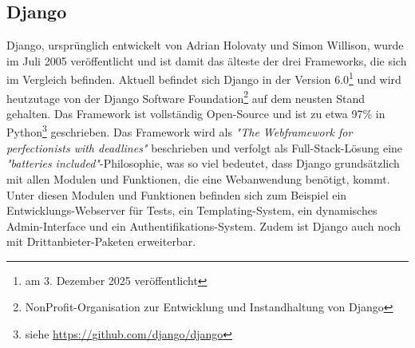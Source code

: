 \documentclass[letterpaper,11pt,leqno]{article}
\begin{document}
\subsection{Django}
Django, ursprünglich entwickelt von Adrian Holovaty und Simon Willison, wurde im Juli 2005
veröffentlicht und ist damit das älteste der drei Frameworks, die sich im Vergleich befinden.
Aktuell befindet sich Django in der Version 6.0\footnote{am 3. Dezember 2025 veröffentlicht} und
wird heutzutage von der Django Software Foundation\footnote{NonProfit-Organisation zur Entwicklung
und Instandhaltung von Django} auf dem neusten Stand gehalten. Das Framework ist vollständig
Open-Source und ist zu etwa 97\% in Python\footnote{siehe \url{https://github.com/django/django}}
geschrieben. Das Framework wird als \textit{"The Webframework for perfectionists
with deadlines"} beschrieben und verfolgt als Full-Stack-Lösung eine
\textit{"batteries included"}-Philosophie, was so viel bedeutet, dass Django grundsätzlich mit allen
Modulen und Funktionen, die eine Webanwendung benötigt, kommt. Unter diesen Modulen und Funktionen
befinden sich zum Beispiel ein Entwicklungs-Webserver für Tests, ein Templating-System, ein
dynamisches Admin-Interface und ein Authentifikations-System. Zudem ist Django auch noch mit
Drittanbieter-Paketen erweiterbar.
\clearpage
\end{document}
